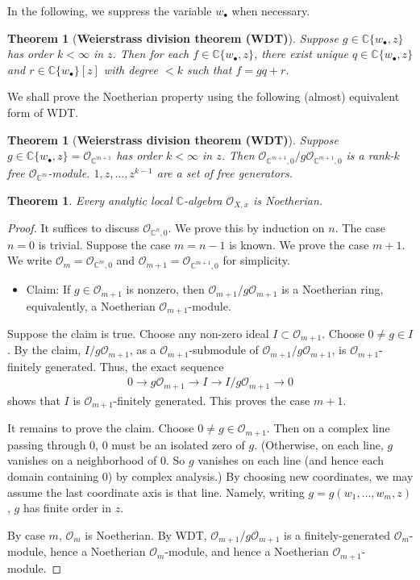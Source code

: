 \documentclass[12pt,b5paper,notitlepage]{report}
\theoremstyle{definition}
\theoremstyle{plain}
\newtheorem{thm}[df]{Theorem}
\newcommand{\scr}{\mathscr}
\newcommand{\blt}{\bullet}
\newcommand{\Cbb}{\mathbb C}
\numberwithin{equation}{section}
\begin{document}
In the following, we suppress the variable $w_\blt$ when necessary.

\begin{thm}[\textbf{Weierstrass division theorem (WDT)}]\label{lb197} 
Suppose $g\in\Cbb\{w_\blt,z\}$ has order $k<\infty$ in $z$. Then for each $f\in\Cbb\{w_\blt,z\}$, there exist unique $q\in\Cbb\{w_\blt,z\}$ and $r\in\Cbb\{w_\blt\}[z]$ with degree $<k$ such that $f=gq+r$.
\end{thm}


We shall prove the Noetherian property using the following (almost) equivalent form of WDT.
\begin{thm}[\textbf{Weierstrass division theorem (WDT)}] 
Suppose $g\in\Cbb\{w_\blt,z\}=\scr O_{\Cbb^{m+1}}$ has order $k<\infty$ in $z$. Then $\scr O_{\Cbb^{m+1},0}/g\scr O_{\Cbb^{m+1},0}$ is a rank-$k$ free $\scr O_{\Cbb^m}$-module. $1,z,\dots,z^{k-1}$ are a set of free generators.
\end{thm}


\begin{thm}\label{lb70}
Every analytic local $\Cbb$-algebra $\scr O_{X,x}$ is Noetherian.
\end{thm}

\begin{proof}
It suffices to discuss $\scr O_{\Cbb^n,0}$. We prove this by induction on $n$. The case $n=0$ is trivial. Suppose the case $m=n-1$ is known. We prove the case $m+1$. We write $\scr O_m=\scr O_{\Cbb^m,0}$ and $\scr O_{m+1}=\scr O_{\Cbb^{m+1},0}$ for simplicity.
\begin{itemize}
\item Claim: If $g\in\scr O_{m+1}$ is nonzero, then $\scr O_{m+1}/g\scr O_{m+1}$ is a Noetherian ring, equivalently, a Noetherian $\scr O_{m+1}$-module.
\end{itemize}


Suppose the claim is true. Choose any non-zero ideal $I\subset\scr O_{m+1}$. Choose $0\neq g\in I$. By the claim, $I/g\scr O_{m+1}$, as a $\scr O_{m+1}$-submodule of $\scr O_{m+1}/g\scr O_{m+1}$, is $\scr O_{m+1}$-finitely generated. Thus, the exact sequence
\begin{align*}
0\rightarrow g\scr O_{m+1}\rightarrow I\rightarrow I/g\scr O_{m+1}\rightarrow0
\end{align*}
shows that $I$ is $\scr O_{m+1}$-finitely generated. This proves the case $m+1$.

It remains to prove the claim. Choose $0\neq g\in\scr O_{m+1}$. Then on a complex line passing through $0$, $0$ must be an isolated zero of $g$. (Otherwise, on each line, $g$ vanishes on a neighborhood of $0$. So $g$ vanishes on each line (and hence each domain containing $0$) by complex analysis.) By choosing new coordinates, we may assume the last coordinate axis is that line. Namely, writing $g=g(w_1,\dots,w_m,z)$, $g$ has finite order in $z$. 

By case $m$, $\scr O_m$ is Noetherian. By WDT, $\scr O_{m+1}/g\scr O_{m+1}$ is a finitely-generated $\scr O_m$-module, hence a Noetherian $\scr O_m$-module, and hence a Noetherian $\scr O_{m+1}$-module.
\end{proof}
\end{document}
